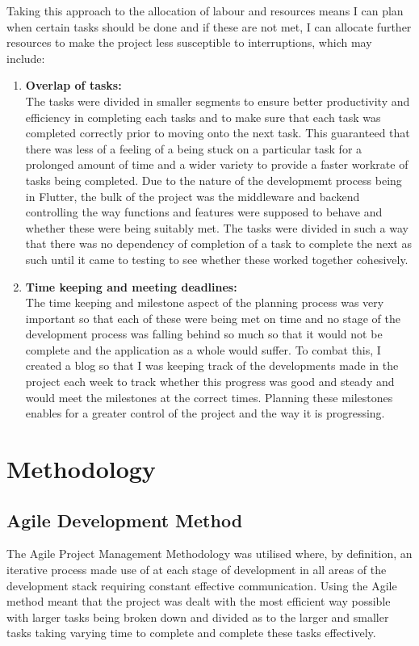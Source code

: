 \documentclass{report}
\begin{document}
Taking this approach to the allocation of labour and resources means I can plan when certain tasks should be done and if these are not met, I can allocate further resources to make the project less susceptible to interruptions, which may include:

\begin{enumerate}
\item \textbf{Overlap of tasks:}\\
The tasks were divided in smaller segments to ensure better productivity and efficiency in completing each tasks and to make sure that each task was completed correctly prior to moving onto the next task. This guaranteed that there was less of a feeling of a being stuck on a particular task for a prolonged amount of time and a wider variety to provide a faster workrate of tasks being completed. Due to the nature of the developmemt process being in Flutter, the bulk of the project was the middleware and backend controlling the way functions and features were supposed to behave and whether these were being suitably met. The tasks were divided in such a way that there was no dependency of completion of a task to complete the next as such until it came to testing to see whether these worked together cohesively.
\item \textbf{Time keeping and meeting deadlines:}\\
The time keeping and milestone aspect of the planning process was very important so that each of these were being met on time and no stage of the development process was falling behind so much so that it would not be complete and the application as a whole would suffer. To combat this, I created a blog so that I was keeping track of the developments made in the project each week to track whether this progress was good and steady and would meet the milestones at the correct times. Planning these milestones enables for a greater control of the project and the way it is progressing.
\end{enumerate}

	\section{Methodology}
		\subsection{Agile Development Method}
The Agile Project Management Methodology was utilised where, by definition, an iterative process made use of at each stage of development in all areas of the development stack requiring constant effective communication. Using the Agile method meant that the project was dealt with the most efficient way possible with larger tasks being broken down and divided as to the larger and smaller tasks taking varying time to complete and complete these tasks effectively.
\end{document}
